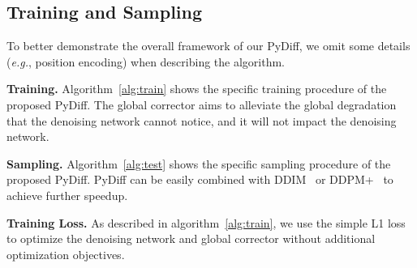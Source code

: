 \documentclass{article}
\def\eg{\emph{e.g.}}
\begin{document}
\subsection{Training and Sampling}
To better demonstrate the overall framework of our PyDiff, we omit some details (\eg, position encoding) when describing the algorithm.

\noindent \textbf{Training.}
Algorithm~\ref{alg:train} shows the specific training procedure of the proposed PyDiff. The global corrector aims to alleviate the global degradation that the denoising network cannot notice, and it will not impact the denoising network.


\noindent \textbf{Sampling.}
Algorithm~\ref{alg:test} shows the specific sampling procedure of the proposed PyDiff. PyDiff can be easily combined with DDIM~\cite{song2020denoising} or DDPM+~\cite{nichol2021improved} to achieve further speedup.

\noindent \textbf{Training Loss.}
As described in algorithm~\ref{alg:train}, we use the simple L1 loss to optimize the denoising network and global corrector without additional optimization objectives.
\end{document}
